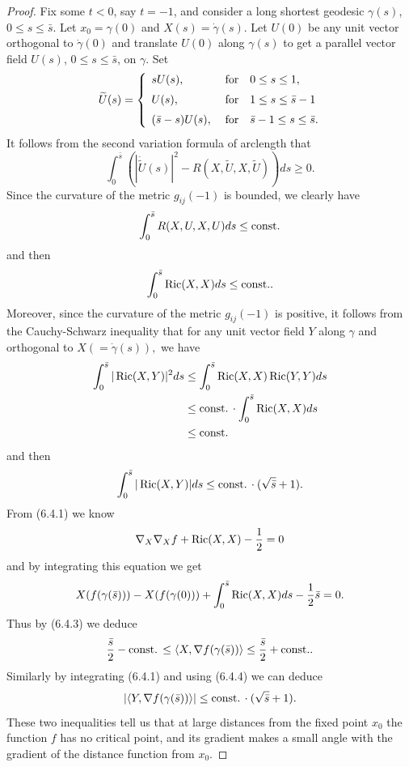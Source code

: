 \begin{proof}
Fix some $t<0$, say $t=-1$, and consider a long shortest geodesic
$\gamma(s)$, $0\le s\le\bar{s}.$ Let $x_0=\gamma(0)$ and
$X(s)=\dot{\gamma}(s).$ Let $U(0)$ be any unit vector orthogonal
to $\dot{\gamma}(0)$ and translate $U(0)$ along $\gamma(s)$ to get
a parallel vector field $U(s)$, $0\le s\le\bar{s}$, on $\gamma$.
Set
$$
\widetilde{U}(s)=\left\{\arraycolsep=1.5pt\begin{array}{lll}
&  sU(s),\quad &  \mbox{for}\quad 0\le s\le 1,\\[2mm]
&  U(s),\quad &  \mbox{for}\quad 1\le s\le\bar{s}-1\\[2mm]
&  (\bar{s}-s)U(s),\quad &  \mbox{for}\quad \bar{s}-1\le s\le
\bar{s}.\end{array}\right.
$$
It follows from the second variation formula of arclength that
$$
\int_0^{\bar{s}}(|\dot{\widetilde{U}}(s)|^2
-R(X,\widetilde{U},X,\widetilde{U}))ds\ge 0.
$$
Since the curvature of the metric $g_{ij}(-1)$ is bounded, we
clearly have
$$
\int_0^{\bar{s}}R(X,U,X,U)ds\le {\rm const.}
$$
and then \begin{equation}
\int_0^{\bar{s}}\Ric(X,X)ds\le {\rm const.}. %
\end{equation} Moreover, since the curvature of the metric $g_{ij}(-1)$ is
positive, it follows from the Cauchy-Schwarz inequality that for
any unit vector field $Y$ along $\gamma$ and orthogonal to
$X(=\dot{\gamma}(s)),$ we have
\begin{align*}
\int_0^{\bar{s}}|\operatorname{Ric}(X,Y)|^2ds
&  \le\int_0^{\bar{s}}\operatorname{Ric}(X,X)\operatorname{Ric}(Y,Y)ds\\
&  \le {\rm const.}\,\cdot\int_0^{\bar{s}}\operatorname{Ric}(X,X)ds\\
&  \le {\rm const.}
\end{align*}
and then \begin{equation} \int_0^{\bar{s}}|\Ric(X,Y)|ds
\le {\rm const.}\,\cdot(\sqrt{\bar{s}}+1). %
\end{equation} {}From (6.4.1) we know
$$
\nabla_X\nabla_Xf+\operatorname{Ric}(X,X)-\frac{1}{2}=0
$$
and by integrating this equation we get
$$
X(f(\gamma(\bar{s})))-X(f(\gamma(0)))
+\int_0^{\bar{s}}\operatorname{Ric}(X,X)ds-\frac{1}{2}\bar{s}=0.
$$
Thus by (6.4.3) we deduce \begin{equation} \frac{\bar{s}}{2}-{\rm const.}\,\le
\langle X,\nabla f(\gamma(\bar{s}))\rangle
\le\frac{\bar{s}}{2}+{\rm const.}.  %
\end{equation} Similarly by integrating (6.4.1) and using (6.4.4) we can
deduce \begin{equation} |\langle Y,\nabla f(\gamma(\bar{s}))\rangle|
\le {\rm const.}\,\cdot (\sqrt{\bar{s}}+1). %
\end{equation} These two inequalities tell us that at large distances from
the fixed point $x_0$ the function $f$ has no critical point, and
its gradient makes a small angle with the gradient of the distance
function from $x_0$.


\end{proof}
